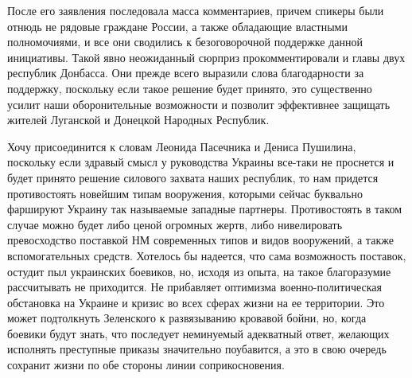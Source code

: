 После его заявления последовала масса комментариев, причем спикеры были отнюдь
не рядовые граждане России, а также обладающие властными полномочиями, и все
они сводились к безоговорочной поддержке данной инициативы. Такой явно
неожиданный сюрприз прокомментировали и главы двух республик Донбасса. Они
прежде всего выразили слова благодарности за поддержку, поскольку если такое
решение будет принято, это существенно усилит наши оборонительные возможности и
позволит эффективнее защищать жителей Луганской и Донецкой Народных Республик.

Хочу присоединится к словам Леонида Пасечника и Дениса Пушилина, поскольку если
здравый смысл у руководства Украины все-таки не проснется и будет принято
решение силового захвата наших республик, то нам придется противостоять
новейшим типам вооружения, которыми сейчас буквально фаршируют Украину так
называемые западные партнеры. Противостоять в таком случае можно будет либо
ценой огромных жертв, либо нивелировать превосходство поставкой НМ современных
типов и видов вооружений, а также вспомогательных средств. Хотелось бы
надеется, что сама возможность поставок, остудит пыл украинских боевиков, но,
исходя из опыта, на такое благоразумие рассчитывать не приходится. Не
прибавляет оптимизма военно-политическая обстановка на Украине и кризис во всех
сферах жизни на ее территории. Это может подтолкнуть Зеленского к развязыванию
кровавой бойни, но, когда боевики будут знать, что последует неминуемый
адекватный ответ, желающих исполнять преступные приказы значительно поубавится,
а это в свою очередь сохранит жизни по обе стороны линии соприкосновения.
